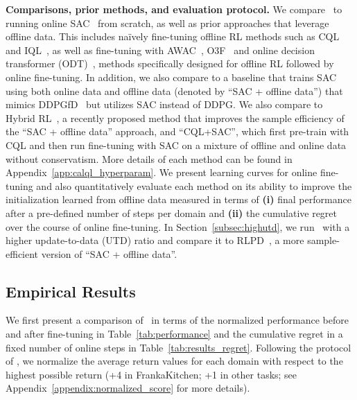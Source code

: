 \noindent \textbf{Comparisons, prior methods, and evaluation protocol.} We compare \methodname\ to running online SAC~\cite{haarnoja2018soft} from scratch, as well as prior approaches that leverage offline data. This includes na\"ively fine-tuning offline RL methods such as CQL~\cite{kumar2020conservative} and IQL~\cite{kostrikov2021iql}, as well as fine-tuning with AWAC~\citep{nair2020accelerating}, O3F~\cite{mark2022fine} and online decision transformer (ODT)~\citep{zheng2022online}, methods specifically designed for offline RL followed by online fine-tuning. In addition, we also compare to a baseline that trains SAC~\cite{haarnoja2018soft} using both online data and offline data (denoted by ``SAC + offline data'') that mimics DDPGfD~\citep{vecerik2017leveraging} but utilizes SAC instead of DDPG. We also compare to Hybrid RL~\citep{song2023hybrid}, a recently proposed method that improves the sample efficiency of the ``SAC + offline data'' approach, and ``CQL+SAC'', which first pre-train with CQL and then run fine-tuning with SAC on a mixture of offline and online data without conservatism. More details of each method can be found in Appendix~\ref{app:calql_hyperparam}.
We present learning curves for online fine-tuning and also quantitatively evaluate each method on its ability to improve the initialization learned from offline data measured in terms of \textbf{(i)} final performance after a pre-defined number of steps per domain and \textbf{(ii)} the cumulative regret over the course of online fine-tuning. In Section~\ref{subsec:highutd}, we run \methodname\ with a higher update-to-data (UTD) ratio and compare it to RLPD~\cite{rlpd}, a more sample-efficient version of ``SAC + offline data''.

\vspace{-0.2cm}
\subsection{Empirical Results} 
\vspace{-0.2cm}

We first present a comparison of \methodname\ in terms of the normalized performance before and after fine-tuning in Table~\ref{tab:performance} and the cumulative regret in a fixed number of online steps in Table~\ref{tab:results_regret}. Following the protocol of \cite{fu2020d4rl}, we normalize the average return values for each domain with respect to the highest possible return (+4 in FrankaKitchen; +1 in other tasks; see Appendix~\ref{appendix:normalized_score} for more details).  

